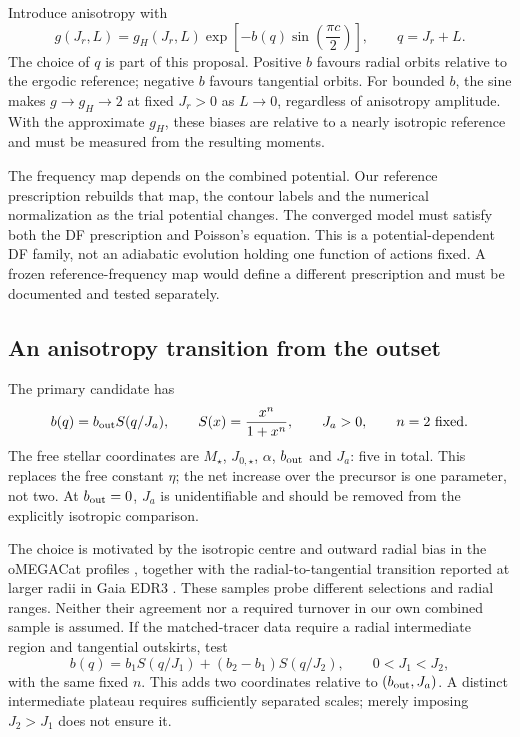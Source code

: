 \documentclass[11pt,a4paper]{article}
\begin{document}
Introduce anisotropy with
\begin{equation}
 g(J_r,L)=g_H(J_r,L)
 \exp\left[-b(q)\sin\left(\frac{\pi c}{2}\right)\right],
 \qquad q=J_r+L.
 \label{eq:g-anisotropy}
\end{equation}
The choice of $q$ is part of this proposal. Positive $b$ favours radial
orbits relative to the ergodic reference; negative $b$ favours tangential
orbits. For bounded $b$, the sine makes $g\to g_H\to2$ at fixed $J_r>0$
as $L\to0$, regardless of anisotropy amplitude. With the approximate
$g_H$, these biases are relative to a nearly isotropic reference and must be
measured from the resulting moments.

The frequency map depends on the combined potential. Our reference
prescription rebuilds that map, the contour labels and the numerical
normalization as the trial potential changes. The converged model must
satisfy both the DF prescription and Poisson's equation. This is a
potential-dependent DF family, not an adiabatic evolution holding one
function of actions fixed. A frozen reference-frequency map would define a
different prescription and must be documented and tested separately.

\subsection{An anisotropy transition from the outset}
\label{sec:transition}

The primary candidate has
\begin{equation}
 b(q)=b_{\rm out}S(q/J_a),\qquad
 S(x)=\frac{x^n}{1+x^n},\qquad J_a>0,\qquad n=2\ \hbox{fixed}.
 \label{eq:b-one}
\end{equation}
The free stellar coordinates are $M_\star$, $J_{0,\star}$, $\alpha$,
$b_{\rm out}$ and $J_a$: five in total.
This replaces the free constant $\eta$; the net increase over the precursor
is one parameter, not two. At $b_{\rm out}=0$, $J_a$ is unidentifiable and
should be removed from the explicitly isotropic comparison.

The choice is motivated by the isotropic centre and outward radial bias in
the oMEGACat profiles \citep{2025ApJ...983...95H}, together with the
radial-to-tangential transition reported at larger radii in Gaia EDR3
\citep{2021MNRAS.505.5978V}. These samples probe different selections and
radial ranges. Neither their agreement nor a required turnover in our own
combined sample is assumed. If the matched-tracer data require a radial
intermediate region and tangential outskirts, test
\begin{equation}
 b(q)=b_1S(q/J_1)+(b_2-b_1)S(q/J_2),\qquad 0<J_1<J_2,
 \label{eq:b-two}
\end{equation}
with the same fixed $n$. This adds two coordinates relative to
$(b_{\rm out},J_a)$. A distinct intermediate plateau requires sufficiently
separated scales; merely imposing $J_2>J_1$ does not ensure it.
\end{document}
